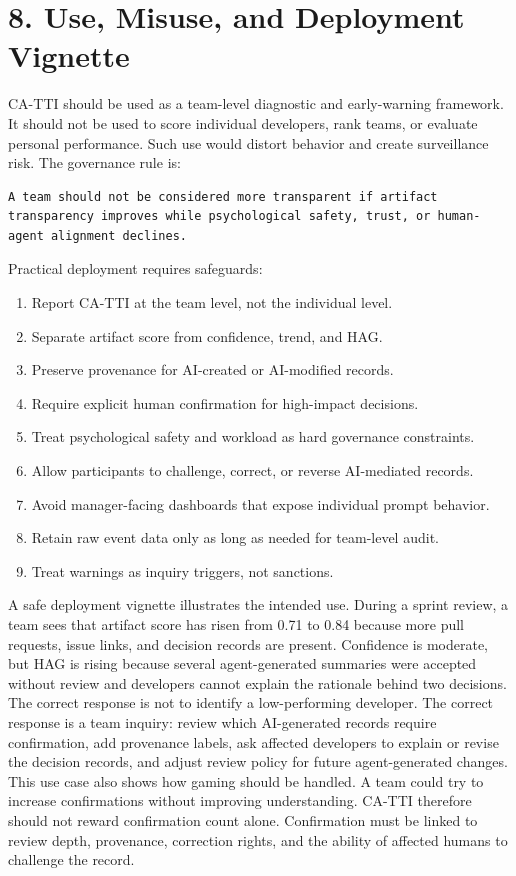 \documentclass[11pt]{article}
\begin{document}
\section{8. Use, Misuse, and Deployment Vignette}
CA-TTI should be used as a team-level diagnostic and early-warning framework. It should not be used to score individual developers, rank teams, or evaluate personal performance. Such use would distort behavior and create surveillance risk.
The governance rule is:
\begin{Verbatim}[fontsize=\small]
A team should not be considered more transparent if artifact transparency improves while psychological safety, trust, or human-agent alignment declines.
\end{Verbatim}
Practical deployment requires safeguards:
\begin{enumerate}[leftmargin=*]
\item Report CA-TTI at the team level, not the individual level.
\item Separate artifact score from confidence, trend, and HAG.
\item Preserve provenance for AI-created or AI-modified records.
\item Require explicit human confirmation for high-impact decisions.
\item Treat psychological safety and workload as hard governance constraints.
\item Allow participants to challenge, correct, or reverse AI-mediated records.
\item Avoid manager-facing dashboards that expose individual prompt behavior.
\item Retain raw event data only as long as needed for team-level audit.
\item Treat warnings as inquiry triggers, not sanctions.
\end{enumerate}
A safe deployment vignette illustrates the intended use. During a sprint review, a team sees that artifact score has risen from 0.71 to 0.84 because more pull requests, issue links, and decision records are present. Confidence is moderate, but HAG is rising because several agent-generated summaries were accepted without review and developers cannot explain the rationale behind two decisions. The correct response is not to identify a low-performing developer. The correct response is a team inquiry: review which AI-generated records require confirmation, add provenance labels, ask affected developers to explain or revise the decision records, and adjust review policy for future agent-generated changes.
This use case also shows how gaming should be handled. A team could try to increase confirmations without improving understanding. CA-TTI therefore should not reward confirmation count alone. Confirmation must be linked to review depth, provenance, correction rights, and the ability of affected humans to challenge the record.
\end{document}
